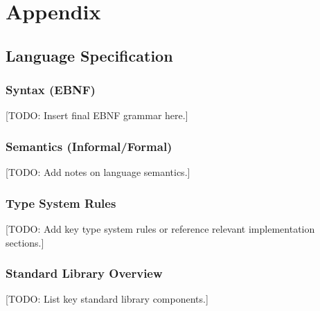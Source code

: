 \chapter{Appendix}

\section{Language Specification} %

\subsection{Syntax (EBNF)} %
[TODO: Insert final EBNF grammar here.]

\subsection{Semantics (Informal/Formal)} %
[TODO: Add notes on language semantics.]

\subsection{Type System Rules} %
[TODO: Add key type system rules or reference relevant implementation sections.]

\subsection{Standard Library Overview} %
[TODO: List key standard library components.]

